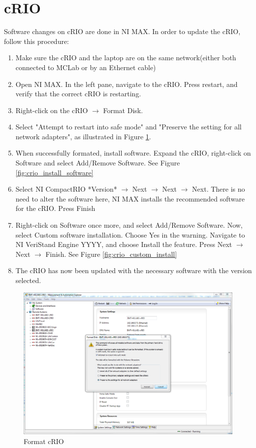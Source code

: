 \documentclass[a4paper,english]{report}
\begin{document}
\section{cRIO}
Software changes on cRIO are done in NI MAX. In order to update the cRIO, follow this procedure: 
\begin{enumerate}
	\item Make sure the cRIO and the laptop are on the same network(either both connected to MCLab or by an Ethernet cable)
	\item Open NI MAX. In the left pane, navigate to the cRIO. Press restart, and verify that the correct cRIO is restarting. 
	\item Right-click on the cRIO $\rightarrow$ Format Disk.
	\item Select "Attempt to restart into safe mode" and "Preserve the setting for all network adapters", as illustrated in Figure \ref{fig:format_crio}.
	\item When successfully formated, install software. Expand the cRIO, right-click on Software and select Add/Remove Software. See Figure \ref{fig:crio_install_software}
	\item Select NI CompactRIO *Version* $\rightarrow$ Next $\rightarrow$ Next $\rightarrow$ Next. There is no need to alter the software here, NI MAX installs the recommended software for the cRIO. Press Finish
	\item Right-click on Software once more, and select Add/Remove Software. Now, select Custom software installation. Choose Yes in the warning. Navigate to NI VeriStand Engine YYYY, and choose Install the feature. Press Next $\rightarrow$ Next $\rightarrow$ Finish. See Figure \ref{fig:crio_custom_install}
	\item The cRIO has now been updated with the necessary software with the version selected. 
\end{enumerate}
\begin{figure}[htb!]
	\centering
	\includegraphics[scale=0.4]{fig/format_crio.png}
	\caption{Format cRIO}
	\label{fig:format_crio}
\end{figure}
\end{document}
